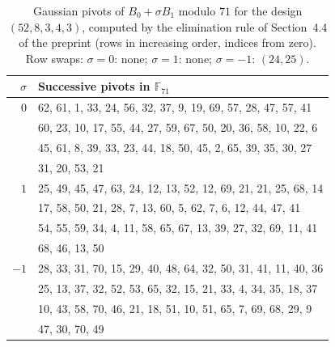 \begin{table}[ht]
\centering
\small
\begin{tabular}{rl}
\hline
$\sigma$ & Successive pivots in $\mathbb{F}_{71}$ \\
\hline
$0$ & 62, 61, 1, 33, 24, 56, 32, 37, 9, 19, 69, 57, 28, 47, 57, 41 \\
 & 60, 23, 10, 17, 55, 44, 27, 59, 67, 50, 20, 36, 58, 10, 22, 6 \\
 & 45, 61, 8, 39, 33, 23, 44, 18, 50, 45, 2, 65, 39, 35, 30, 27 \\
 & 31, 20, 53, 21 \\
\hline
$1$ & 25, 49, 45, 47, 63, 24, 12, 13, 52, 12, 69, 21, 21, 25, 68, 14 \\
 & 17, 58, 50, 21, 28, 7, 13, 60, 5, 62, 7, 6, 12, 44, 47, 41 \\
 & 54, 55, 59, 34, 4, 11, 58, 65, 67, 13, 39, 27, 32, 69, 11, 41 \\
 & 68, 46, 13, 50 \\
\hline
$-1$ & 28, 33, 31, 70, 15, 29, 40, 48, 64, 32, 50, 31, 41, 11, 40, 36 \\
 & 25, 13, 37, 32, 52, 53, 65, 32, 15, 21, 33, 4, 34, 35, 18, 37 \\
 & 10, 43, 58, 70, 46, 21, 18, 51, 10, 51, 65, 7, 69, 68, 29, 9 \\
 & 47, 30, 70, 49 \\
\hline
\end{tabular}
\caption{Gaussian pivots of $B_0+\sigma B_1$ modulo $71$ for the design $(52,8,3,4,3)$, computed by the elimination rule of Section~4.4 of the preprint (rows in increasing order, indices from zero). Row swaps: $\sigma=0$: none; $\sigma=1$: none; $\sigma=-1$: $(24,25)$.}
\label{tab:pivots71}
\end{table}
